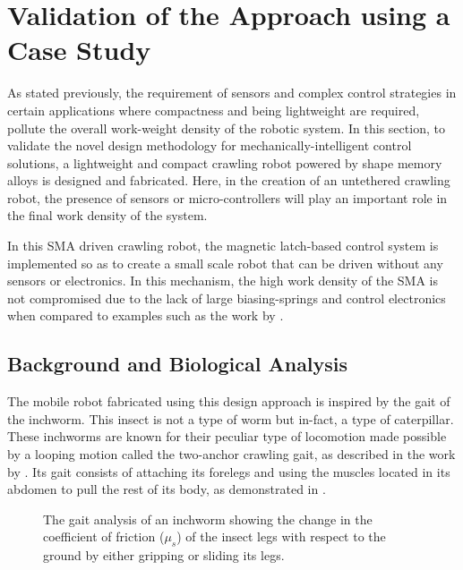 \section{Validation of the Approach using a Case Study}
As stated previously, the requirement of sensors and complex control strategies in certain applications where compactness and being lightweight are required, pollute the overall work-weight density of the robotic system. In this section, to validate the novel design methodology for mechanically-intelligent control solutions, a lightweight and compact crawling robot powered by shape memory alloys is designed and fabricated. Here, in the creation of an untethered crawling robot, the presence of sensors or micro-controllers will play an important role in the final work density of the system.

In this SMA driven crawling robot, the magnetic latch-based control system is implemented so as to create a small scale robot that can be driven without any sensors or electronics. In this mechanism, the high work density of the SMA is not compromised due to the lack of large biasing-springs and control electronics when compared to examples such as the work by \cite{muralidharanInvestigationsBendingCharacteristics2021}.

\subsection{Background and Biological Analysis}\label{subsec:bio-analysis}
The mobile robot fabricated using this design approach is inspired by the gait of the inchworm. This insect is not a type of worm but in-fact, a type of caterpillar. These inchworms are known for their peculiar type of locomotion made possible by a looping motion called the two-anchor crawling gait, as described in the work by \cite{wang_locomotion_2014}. Its gait consists of attaching its forelegs and using the muscles located in its abdomen to pull the rest of its body, as demonstrated in \cite{plautMathematicalModelInchworm2015}.

\begin{figure}[ht!] %
  \centering
  \def\svgwidth{\textwidth}
  \resizebox{\textwidth}{!}{}
  \caption[The gait analysis of an inchworm]{The gait analysis of an inchworm showing the change in the coefficient of friction ($\mu_s$) of the insect legs with respect to the ground by either gripping or sliding its legs.}
  \label{fig:real-inchworm-diagram}
\end{figure}

